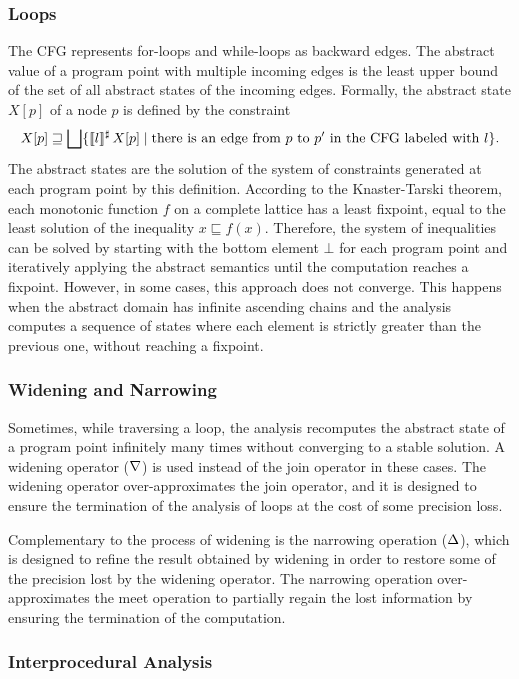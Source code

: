\subsubsection{Loops}
The CFG represents for-loops and while-loops as backward edges.
The abstract value of a program point with multiple incoming edges is
the least upper bound of the set of all abstract states of the incoming edges.
Formally, the abstract state $X[p]$ of a node $p$ is defined by the constraint
\[
 X[p] \sqsupseteq \bigsqcup \{\llbracket l\rrbracket^\sharp\,X[p] \mid \text{there is an edge from $p$ to $p'$ in the CFG labeled with $l$}\}.
\]
The abstract states are the solution of the system of constraints generated at each program point by this definition.
According to the Knaster-Tarski theorem, each monotonic function $f$ on a complete lattice has a least fixpoint, equal to the least solution of the inequality $x \sqsubseteq f(x)$.
Therefore, the system of inequalities can be solved by starting with the bottom element $\bot$ for each program point and iteratively applying the abstract semantics until the computation reaches a fixpoint.
However, in some cases, this approach does not converge.
This happens when the abstract domain has infinite ascending chains and the analysis computes a sequence of states where each element is strictly greater than the previous one, without reaching a fixpoint.

\subsubsection{Widening and Narrowing}

Sometimes, while traversing a loop, the analysis recomputes the abstract state of a program point infinitely many times without converging to a stable solution.
A widening operator ($\nabla$) is used instead of the join operator in these cases.
The widening operator over-approximates the join operator, and it is designed to ensure the termination of the analysis of loops at the cost of some precision loss.

Complementary to the process of widening is the narrowing operation ($\Delta$), which is designed to refine the result obtained by widening in order to restore some of the precision lost by the widening operator.
The narrowing operation over-approximates the meet operation to partially regain the lost information by ensuring the termination of the computation.

\subsubsection{Interprocedural Analysis}


